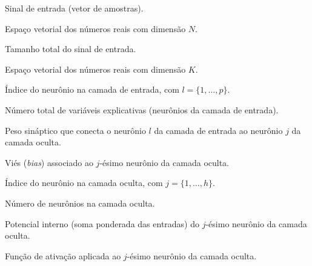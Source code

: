\documentclass[
	12pt,				%
	oneside,
	a4paper,			%
	english,			%
	french,				%
	spanish,			%
	brazil				%
	]{abntex2}
\begin{document}

\begin{simbolos}
\item[\textbf{$x$}] Sinal de entrada (vetor de amostras).
\item[\textbf{$\mathbb{R}^{N}$}] Espaço vetorial dos números reais com dimensão $N$.
\item[\textbf{$N$}] Tamanho total do sinal de entrada.
\item[\textbf{$\mathbb{R}^{K}$}] Espaço vetorial dos números reais com dimensão $K$.
\item[\textbf{$l$}] Índice do neurônio na camada de entrada, com $l = \{1,\ldots,p\}$.
\item[\textbf{$p$}] Número total de variáveis explicativas (neurônios da camada de entrada).
\item[\textbf{$\omega^{h}_{j,l}$}] Peso sináptico que conecta o neurônio $l$ da camada de entrada ao neurônio $j$ da camada oculta.
\item[\textbf{$\theta^{h}_{j}$}] Viés (\textit{bias}) associado ao $j$-ésimo neurônio da camada oculta.
\item[\textbf{$j$}] Índice do neurônio na camada oculta, com $j = \{1,\ldots,h\}$.
\item[\textbf{$h$}] Número de neurônios na camada oculta.
\item[\textbf{$\mathrm{rede}^{h}_{j}$}] Potencial interno (soma ponderada das entradas) do $j$-ésimo neurônio da camada oculta.
\item[\textbf{$f^{h}_{j}(\cdot)$}] Função de ativação aplicada ao $j$-ésimo neurônio da camada oculta.

\end{simbolos}
\end{document}
